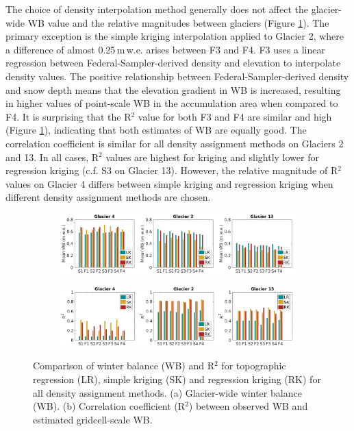 \documentclass{sfuthesis}
\begin{document}
The choice of density interpolation method generally does not affect the glacier-wide WB value and the relative magnitudes between glaciers (Figure \ref{fig:InterpMethod_allopts}). The primary exception is the simple kriging interpolation applied to Glacier 2, where a difference of almost 0.25\,m\,w.e. arises between F3 and F4. F3 uses a linear regression between Federal-Sampler-derived density and elevation to interpolate density values. The positive relationship between Federal-Sampler-derived density and snow depth means that the elevation gradient in WB is increased, resulting in higher values of point-scale WB in the accumulation area when compared to F4.  It is surprising that the R$^2$ value for both F3 and F4 are similar and high (Figure \ref{fig:InterpMethod_allopts}), indicating that both estimates of WB are equally good. The correlation coefficient is similar for all density assignment methods on Glaciers 2 and 13. In all cases, R$^2$ values are highest for kriging and slightly lower for regression kriging (c.f. S3 on Glacier 13). However, the relative magnitude of R$^2$ values on Glacier 4 differs between simple kriging and regression kriging when different density assignment methods are chosen.  


\begin{figure}
    \centering
    \begin{subfigure}[b]{\textwidth}
      \includegraphics[width=\textwidth]{InterpMethod_allopts.png}
        \caption[]{}
    \end{subfigure}
    
    \begin{subfigure}[b]{\textwidth}
      \includegraphics[width=\textwidth]{InterpMethod_alloptsR2.png}
        \caption[]{}
    \end{subfigure}

   \caption[Comparison of winter balance (WB) and R$^2$ for topographic regression (LR), simple kriging (SK) and regression kriging (RK) for all density options]{Comparison of winter balance (WB) and R$^2$ for topographic regression (LR), simple kriging (SK) and regression kriging (RK) for all density assignment methods. (a) Glacier-wide winter balance (WB). (b) Correlation coefficient (R$^2$) between observed WB and estimated gridcell-scale WB.}
	\label{fig:InterpMethod_allopts}
\end{figure}
\end{document}
